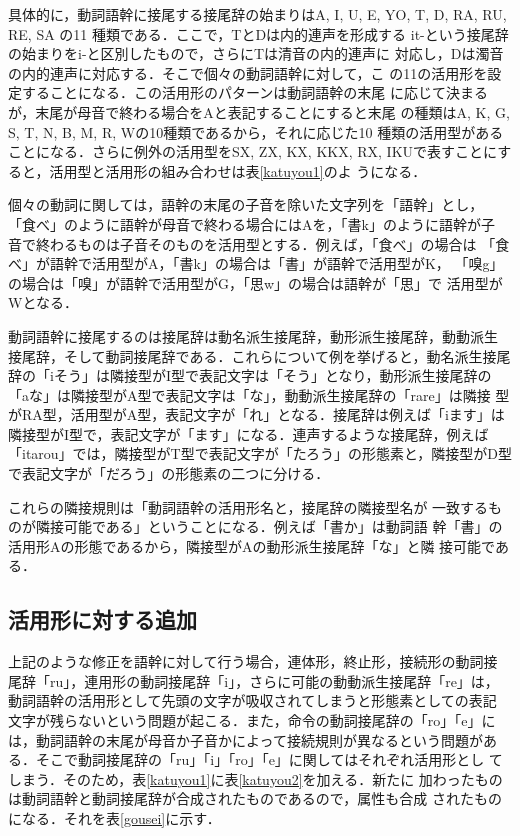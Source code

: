 具体的に，動詞語幹に接尾する接尾辞の始まりはA, I, U, E, YO,
T, D, RA, RU, RE, SA の11 種類である．ここで，TとDは内的連声を形成する
it-という接尾辞の始まりをi-と区別したもので，さらにTは清音の内的連声に
対応し，Dは濁音の内的連声に対応する．そこで個々の動詞語幹に対して，こ
の11の活用形を設定することになる．この活用形のパターンは動詞語幹の末尾
に応じて決まるが，末尾が母音で終わる場合をAと表記することにすると末尾
の種類はA, K, G, S, T, N, B, M, R, Wの10種類であるから，それに応じた10
種類の活用型があることになる．さらに例外の活用型をSX, ZX, KX, KKX, RX,
IKUで表すことにすると，活用型と活用形の組み合わせは表\ref{katuyou1}のよ
うになる．

個々の動詞に関しては，語幹の末尾の子音を除いた文字列を「語幹」とし，
「食べ」のように語幹が母音で終わる場合にはAを，「書k」のように語幹が子
音で終わるものは子音そのものを活用型とする．例えば，「食べ」の場合は
「食べ」が語幹で活用型がA，「書k」の場合は「書」が語幹で活用型がK，
「嗅g」の場合は「嗅」が語幹で活用型がG，「思w」の場合は語幹が「思」で
活用型がWとなる．

動詞語幹に接尾するのは接尾辞は動名派生接尾辞，動形派生接尾辞，動動派生
接尾辞，そして動詞接尾辞である．これらについて例を挙げると，動名派生接尾
辞の「iそう」は隣接型がI型で表記文字は「そう」となり，動形派生接尾辞の
「aな」は隣接型がA型で表記文字は「な」，動動派生接尾辞の「rare」は隣接
型がRA型，活用型がA型，表記文字が「れ」となる．接尾辞は例えば「iます」は
隣接型がI型で，表記文字が「ます」になる．連声するような接尾辞，例えば
「itarou」では，隣接型がT型で表記文字が「たろう」の形態素と，隣接型がD型
で表記文字が「だろう」の形態素の二つに分ける．

これらの隣接規則は「動詞語幹の活用形名と，接尾辞の隣接型名が
一致するものが隣接可能である」ということになる．例えば「書か」は動詞語
幹「書」の活用形Aの形態であるから，隣接型がAの動形派生接尾辞「な」と隣
接可能である．

\subsection{活用形に対する追加}
上記のような修正を語幹に対して行う場合，連体形，終止形，接続形の動詞接
尾辞「ru」，連用形の動詞接尾辞「i」，さらに可能の動動派生接尾辞「re」は，
動詞語幹の活用形として先頭の文字が吸収されてしまうと形態素としての表記
文字が残らないという問題が起こる．また，命令の動詞接尾辞の「ro」「e」に
は，動詞語幹の末尾が母音か子音かによって接続規則が異なるという問題があ
る．そこで動詞接尾辞の「ru」「i」「ro」「e」に関してはそれぞれ活用形とし
てしまう．そのため，表\ref{katuyou1}に表\ref{katuyou2}を加える．新たに
加わったものは動詞語幹と動詞接尾辞が合成されたものであるので，属性も合成
されたものになる．それを表\ref{gousei}に示す．

